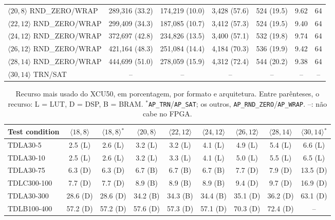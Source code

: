 \begin{table}[p]
\begin{tabular}{lcccccc}
$\langle 20,8\rangle$ RND\_ZERO/WRAP & 289,316 (33.2) & 174,219 (10.0) & 3,428 (57.6) & 524 (19.5) & 9.62 & 64 \\
$\langle 22,12\rangle$ RND\_ZERO/WRAP & 299,409 (34.3) & 187,085 (10.7) & 3,412 (57.3) & 524 (19.5) & 9.40 & 64 \\
$\langle 24,12\rangle$ RND\_ZERO/WRAP & 372,697 (42.8) & 234,826 (13.5) & 3,400 (57.1) & 532 (19.8) & 9.74 & 64 \\
$\langle 26,12\rangle$ RND\_ZERO/WRAP & 421,164 (48.3) & 251,084 (14.4) & 4,184 (70.3) & 536 (19.9) & 9.42 & 64 \\
$\langle 28,14\rangle$ RND\_ZERO/WRAP & 444,699 (51.0) & 278,059 (15.9) & 4,312 (72.4) & 544 (20.2) & 9.38 & 64 \\
$\langle 30,14\rangle$ TRN/SAT & -- & -- & -- & -- & -- & -- \\
\bottomrule
\end{tabular}
\vspace{4pt}
\end{table}

\begin{table}[htbp]
\caption[Recurso mais usado do XCU50, em porcentagem, por formato e arquitetura.]{Recurso mais usado do XCU50, em porcentagem, por formato e arquitetura. Entre parênteses, o recurso: L = LUT, D = DSP, B = BRAM. $^{*}$\texttt{AP\_TRN}/\texttt{AP\_SAT}; os outros, \texttt{AP\_RND\_ZERO}/\texttt{AP\_WRAP}. --: não cabe no FPGA.}
\label{tab:recurso-mais-usado}
\vspace{4pt} %
\centering
\footnotesize
\renewcommand{\arraystretch}{1.2}
\setlength{\tabcolsep}{4pt}
\begin{tabular}{lcccccccc}
\toprule
\textbf{Test condition} & \textbf{$\langle 18,8\rangle$} & \textbf{$\langle 18,8\rangle$$^{*}$} & \textbf{$\langle 20,8\rangle$} & \textbf{$\langle 22,12\rangle$} & \textbf{$\langle 24,12\rangle$} & \textbf{$\langle 26,12\rangle$} & \textbf{$\langle 28,14\rangle$} & \textbf{$\langle 30,14\rangle$$^{*}$} \\
\midrule
TDLA30-5 & 2.5 (L) & 2.6 (L) & 3.2 (L) & 3.2 (L) & 4.1 (L) & 4.9 (L) & 5.4 (L) & 6.6 (L) \\
TDLA30-10 & 2.5 (L) & 2.6 (L) & 3.2 (L) & 3.3 (L) & 4.1 (L) & 5.0 (L) & 5.5 (L) & 6.5 (L) \\
TDLA30-75 & 6.3 (D) & 6.3 (D) & 6.7 (B) & 6.7 (B) & 6.7 (B) & 7.7 (D) & 7.9 (D) & 13.5 (D) \\
TDLC300-100 & 7.7 (D) & 7.7 (D) & 8.9 (B) & 8.9 (B) & 8.9 (B) & 9.4 (D) & 9.7 (D) & 16.9 (D) \\
TDLA30-300 & 28.6 (D) & 28.6 (D) & 34.2 (B) & 34.3 (B) & 34.4 (B) & 35.1 (D) & 36.2 (D) & 63.1 (D) \\
TDLB100-400 & 57.2 (D) & 57.2 (D) & 57.6 (D) & 57.3 (D) & 57.1 (D) & 70.3 (D) & 72.4 (D) & -- \\
\bottomrule
\end{tabular}
\vspace{4pt}
\end{table}

